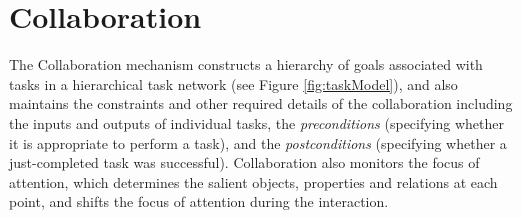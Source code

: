 \documentclass{article}
\begin{document}
% 
% 
% 
% 

\vspace*{-3mm}
\section{Collaboration}
\label{sec:collaboration}

The Collaboration mechanism constructs a hierarchy of goals associated with
tasks in a hierarchical task network (see Figure \ref{fig:taskModel}), and also
maintains the constraints and other required details of the collaboration
including the inputs and outputs of individual tasks, the \textit{preconditions}
(specifying whether it is appropriate to perform a task), and the
\textit{postconditions} (specifying whether a just-completed task was
successful). Collaboration also monitors the focus of attention, which
determines the salient objects, properties and relations at each point, and
shifts the focus of attention during the interaction.
\end{document}

